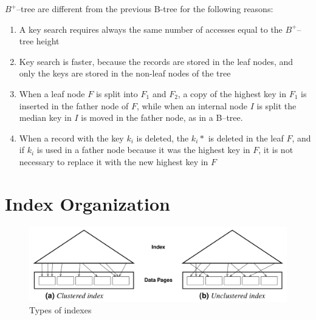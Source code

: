 \(B^+\)–tree are different from the previous B-tree for the following reasons:
\begin{enumerate}
    \item A key search requires always the same number of accesses equal to the \(B^+\)–tree height
    \item Key search is faster, because the records are stored in the leaf nodes, and only the keys are stored in the non-leaf nodes of the tree
    \item When a leaf node \(F\) is split into \(F_1\) and \(F_2\), a copy of the highest key in \(F_1\) is inserted in the father node of \(F\), while when an internal node \(I\) is split the median key in \(I\) is moved in the father node, as in a B–tree.
    \item When a record with the key \(k_i\) is deleted, the \(k_i*\) is deleted in the leaf \(F\), and if \(k_i\) is used in a father node because it was the highest key in \(F\), it is not necessary to replace it with the new highest key in \(F\)
\end{enumerate}


\section{Index Organization}

\begin{figure}[!h]
    \centering
    \includegraphics[width=0.7\linewidth]{images/DBMS_Internals/DynamicTreeStructureOrganizations/indexes_types.jpeg}
    \caption{Types of indexes}
\end{figure}

